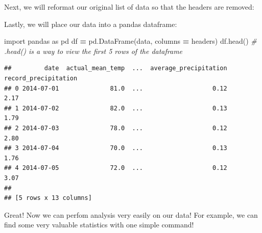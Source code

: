 \documentclass[]{book}
\newenvironment{Shaded}{\begin{snugshade}}{\end{snugshade}}
\newcommand{\KeywordTok}[1]{\textcolor[rgb]{0.13,0.29,0.53}{\textbf{#1}}}
\newcommand{\DecValTok}[1]{\textcolor[rgb]{0.00,0.00,0.81}{#1}}
\newcommand{\SpecialCharTok}[1]{\textcolor[rgb]{0.00,0.00,0.00}{#1}}
\newcommand{\StringTok}[1]{\textcolor[rgb]{0.31,0.60,0.02}{#1}}
\newcommand{\ImportTok}[1]{#1}
\newcommand{\CommentTok}[1]{\textcolor[rgb]{0.56,0.35,0.01}{\textit{#1}}}
\newcommand{\ControlFlowTok}[1]{\textcolor[rgb]{0.13,0.29,0.53}{\textbf{#1}}}
\newcommand{\OperatorTok}[1]{\textcolor[rgb]{0.81,0.36,0.00}{\textbf{#1}}}
\newcommand{\BuiltInTok}[1]{#1}
\newcommand{\NormalTok}[1]{#1}
\begin{document}
Next, we will reformat our original list of data so that the headers are
removed:

\begin{Shaded}
\end{Shaded}

Lastly, we will place our data into a pandas dataframe:

\begin{Shaded}
\begin{Highlighting}[]
\ImportTok{import}\NormalTok{ pandas }\ImportTok{as}\NormalTok{ pd}
\NormalTok{df }\OperatorTok{=}\NormalTok{ pd.DataFrame(data, columns }\OperatorTok{=}\NormalTok{ headers)}
\NormalTok{df.head()     }\CommentTok{# .head() is a way to view the first 5 rows of the dataframe}
\end{Highlighting}
\end{Shaded}

\begin{verbatim}
##         date  actual_mean_temp  ...  average_precipitation  record_precipitation
## 0 2014-07-01              81.0  ...                   0.12                  2.17
## 1 2014-07-02              82.0  ...                   0.13                  1.79
## 2 2014-07-03              78.0  ...                   0.12                  2.80
## 3 2014-07-04              70.0  ...                   0.13                  1.76
## 4 2014-07-05              72.0  ...                   0.12                  3.07
## 
## [5 rows x 13 columns]
\end{verbatim}

Great! Now we can perfom analysis very easily on our data! For example,
we can find some very valuable statistics with one simple command!
\end{document}
